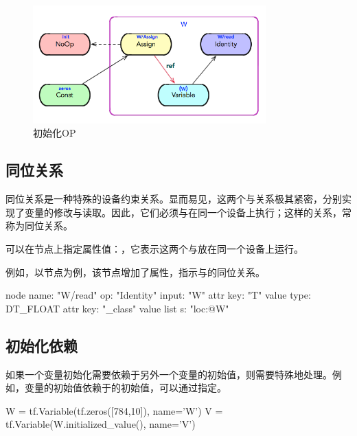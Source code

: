 \begin{content}
\begin{figure}[!h]
\centering
\includegraphics[width=0.8\textwidth]{figures/variable-initialization-no-op.png}
\caption{初始化OP}
 \label{fig:variable-initialization-no-op}
\end{figure}

\subsection{同位关系}

同位关系是一种特殊的设备约束关系。显而易见，这两个与关系极其紧密，分别实现了变量的修改与读取。因此，它们必须与在同一个设备上执行；这样的关系，常称为同位关系。

可以在节点上指定属性值：\code{[s: "loc:@W"]}，它表示这两个与放在同一个设备上运行。

例如，以节点为例，该节点增加了属性，指示与的同位关系。

\begin{leftbar}
\begin{python}
node {
  name: "W/read"
  op: "Identity"
  input: "W"
  attr {
    key: "T"
    value {
      type: DT_FLOAT
    }
  }
  attr {
    key: "_class"
    value {
      list {
        s: "loc:@W"
      }
    }
  }
}
\end{python}
\end{leftbar}

\subsection{初始化依赖}

如果一个变量初始化需要依赖于另外一个变量的初始值，则需要特殊地处理。例如，变量的初始值依赖于的初始值，可以通过指定。

\begin{leftbar}
\begin{python}
W = tf.Variable(tf.zeros([784,10]), name='W')
V = tf.Variable(W.initialized_value(), name='V')
\end{python}
\end{leftbar}


\end{content}
